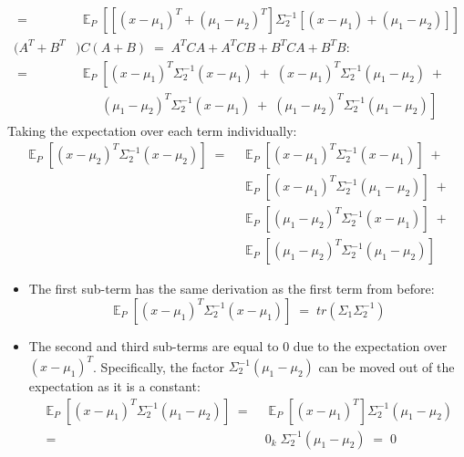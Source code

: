 \documentclass[12pt]{report}
\DeclareMathOperator{\E}{\mathbb{E}}
\begin{document}
\begin{itemize}
\begin{align*}
            \;=&\; \E_P \left[ \left[(x - \mu_1)^T + (\mu_1 - \mu_2)^T\right]
                \Sigma_2^{-1} [(x - \mu_1) + (\mu_1 - \mu_2)] \right] \\[2.5ex]
            (A^T + B^T&)C(A + B) \;=\; A^TCA + A^TCB + B^TCA + B^TB: \\[2.5ex]
            \;=&\; \E_P \left[ (x - \mu_1)^T\Sigma_2^{-1}(x - \mu_1) \;+\;
                (x - \mu_1)^T\Sigma_2^{-1}(\mu_1 - \mu_2) \;+ \right. \\[2ex]
                & \quad\;\;\;\,
                \left. (\mu_1 - \mu_2)^T\Sigma_2^{-1}(x - \mu_1) \;+\; 
                (\mu_1 - \mu_2)^T\Sigma_2^{-1}(\mu_1 - \mu_2) \right]
        \end{align*}
        \clearpage
        Taking the expectation over each term individually:
        \begin{align*}
            \E_P \left[(x - \mu_2)^T\Sigma_2^{-1} (x - \mu_2)\right]
            \;=\; &\E_P \left[(x - \mu_1)^T\Sigma_2^{-1}(x - \mu_1)\right] \;+\\[2ex]
                  &\E_P \left[(x - \mu_1)^T\Sigma_2^{-1}(\mu_1 - \mu_2)\right]\;+\\[2ex]
                  &\E_P \left[(\mu_1 - \mu_2)^T\Sigma_2^{-1}(x - \mu_1)\right]\;+\\[2ex]
                  &\E_P \left[(\mu_1 - \mu_2)^T\Sigma_2^{-1}(\mu_1 - \mu_2)\right]
        \end{align*}
        \begin{itemize}
            \item The first sub-term has the same derivation as the first
                term from before:
                $$\E_P \left[ (x - \mu_1)^T\Sigma_2^{-1}(x - \mu_1) \right] \;=\;
                    tr(\Sigma_1\Sigma_2^{-1})$$
            \item The second and third sub-terms are equal to $0$ due to the
                expectation over $(x - \mu_1)^T$. Specifically, the factor
                $\Sigma_2^{-1} (\mu_1 - \mu_2)$ can be moved out of the expectation
                as it is a constant:
                \begin{align*}
                    \E_P \left[ (x - \mu_1)^T\Sigma_2^{-1}(\mu_1 - \mu_2) \right]
                    \;=&\; \E_P \left[ (x - \mu_1)^T \right]
                        \Sigma_2^{-1}(\mu_1 - \mu_2) \\
                    \;=&\; 0_k \; \Sigma_2^{-1}(\mu_1 - \mu_2) \;=\; 0 \\[1.5ex]

\end{align*}
\end{itemize}
\end{itemize}
\end{document}
